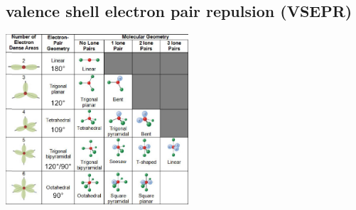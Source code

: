 \subsection{valence shell electron pair repulsion (VSEPR)}
    \includegraphics[width=68mm]{src/4_Molecular_models/images/VSEPER.PNG}